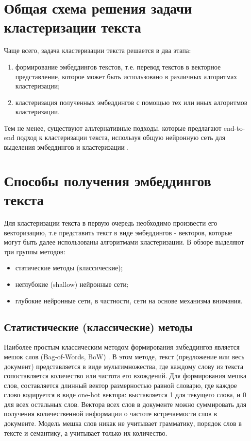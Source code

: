 \section{Общая схема решения задачи кластеризации текста}

Чаще всего, задача кластеризации текста решается в два этапа:
\begin{enumerate}
    \item формирование эмбеддингов текстов, т.е. перевод текстов в векторное представление, которое может быть использовано в различных алгоритмах кластеризации;
    \item кластеризация полученных эмбеддингов с помощью тех или иных алгоритмов кластеризации.
\end{enumerate}

Тем не менее, существуют альтернативные подходы, которые предлагают end-to-end подход к кластеризации текста, используя общую нейронную сеть для выделения эмбеддингов и кластеризации \cite{end-to-end-clustering}.

\section{Способы получения эмбеддингов текста}

Для кластеризации текста в первую очередь необходимо произвести его векторизацию, т.е представить текст в виде эмбеддингов - векторов, которые могут быть далее использованы алгоритмами кластеризации. В обзоре \cite{no-patterns} выделяют три группы методов:
\begin{itemize}
    \item статические методы (классические);
    \item неглубокие (shallow) нейронные сети;
    \item глубокие нейронные сети, в частности, сети на основе механизма внимания.
\end{itemize}

\subsection{Статистические (классические) методы}

Наиболее простым классическим методом формирования эмбеддингов является мешок слов (Bag-of-Words, BoW) \cite{bagofwords}. В этом методе, текст (предложение или весь документ) представляется в виде мультимножества, где каждому слову из текста сопоставляется количество или частота его вхождений. Для формирования мешка слов, составляется длинный вектор размерностью равной словарю, где каждое слово кодируется в виде one-hot вектора: выставляется 1 для текущего слова, и 0 для всех остальных слов. Вектора всех слов в документе можно суммировать для получения количественной информации о частоте встречаемости слов в документе. Модель мешка слов никак не учитывает грамматику, порядок слов в тексте и семантику, а учитывает только их количество.

